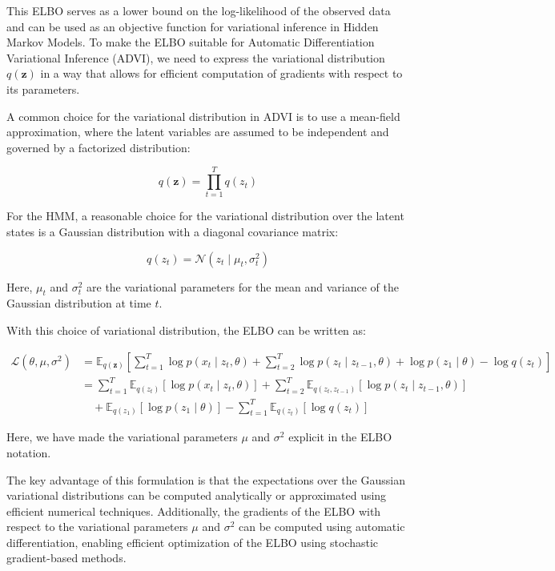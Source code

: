 \documentclass[11pt]{article}
\begin{document}
    This ELBO serves as a lower bound on the log-likelihood of the observed data and can be used as an objective function for variational inference in Hidden Markov Models.
    To make the ELBO suitable for Automatic Differentiation Variational Inference (ADVI), we need to express the variational distribution $q(\mathbf{z})$ in a way that allows for efficient computation of gradients with respect to its parameters.

    A common choice for the variational distribution in ADVI is to use a mean-field approximation, where the latent variables are assumed to be independent and governed by a factorized distribution:

    $$q(\mathbf{z}) = \prod_{t=1}^T q(z_t)$$

    For the HMM, a reasonable choice for the variational distribution over the latent states is a Gaussian distribution with a diagonal covariance matrix:

    $$q(z_t) = \mathcal{N}(z_t \mid \mu_t, \sigma_t^2)$$

    Here, $\mu_t$ and $\sigma_t^2$ are the variational parameters for the mean and variance of the Gaussian distribution at time $t$.

    With this choice of variational distribution, the ELBO can be written as:

    \begin{align*}
        \mathcal{L}(\theta, \mu, \sigma^2) &= \mathbb{E}_{q(\mathbf{z})} \left[ \sum_{t=1}^T \log p(x_t \mid z_t, \theta) + \sum_{t=2}^T \log p(z_t \mid z_{t-1}, \theta) + \log p(z_1 \mid \theta) - \log q(z_t) \right] \\
        &= \sum_{t=1}^T \mathbb{E}_{q(z_t)} \left[ \log p(x_t \mid z_t, \theta) \right] + \sum_{t=2}^T \mathbb{E}_{q(z_t, z_{t-1})} \left[ \log p(z_t \mid z_{t-1}, \theta) \right] \\
        &\quad+ \mathbb{E}_{q(z_1)} \left[ \log p(z_1 \mid \theta) \right] - \sum_{t=1}^T \mathbb{E}_{q(z_t)} \left[ \log q(z_t) \right]
    \end{align*}

    Here, we have made the variational parameters $\mu$ and $\sigma^2$ explicit in the ELBO notation.

    The key advantage of this formulation is that the expectations over the Gaussian variational distributions can be computed analytically or approximated using efficient numerical techniques. Additionally, the gradients of the ELBO with respect to the variational parameters $\mu$ and $\sigma^2$ can be computed using automatic differentiation, enabling efficient optimization of the ELBO using stochastic gradient-based methods.
\end{document}
